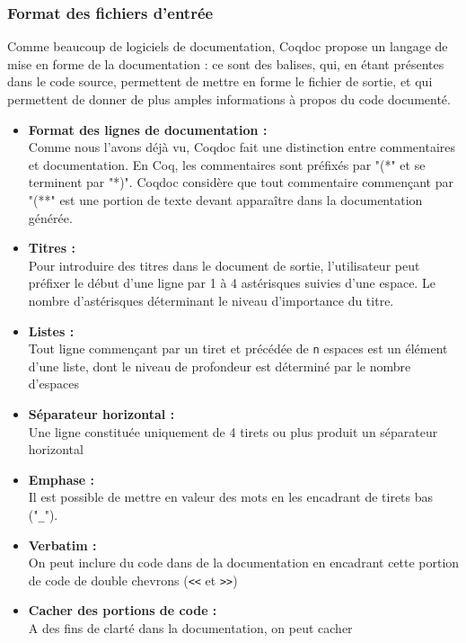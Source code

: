 \documentclass[a4paper, 11pt]{report}
\begin{document}
    \subsubsection{Format des fichiers d'entrée}
    Comme beaucoup de logiciels de documentation, Coqdoc propose un langage de
    mise en forme de la documentation : ce sont des balises, qui, en étant
    présentes dans le code source, permettent de mettre en forme le fichier de sortie,
    et qui permettent de donner de plus amples informations à propos du code
    documenté.
    \begin{itemize}
      \item[] \textbf{Format des lignes de documentation :} \\
      Comme nous l'avons déjà vu, Coqdoc fait une distinction entre commentaires
      et documentation. En Coq, les commentaires sont préfixés par "(*" et se
      terminent par "*)". Coqdoc considère que tout commentaire commençant par
      "(**" est une portion de texte devant apparaître dans la documentation
      générée.
      \item[] \textbf{Titres :} \\
      Pour introduire des titres dans le document de sortie, l'utilisateur
      peut préfixer le début d'une ligne par 1 à 4 astérisques suivies d'une
      espace. Le nombre d'astérisques déterminant le niveau d'importance du
      titre.
      \item[] \textbf{Listes :} \\
        Tout ligne commençant par un tiret et précédée de \texttt{n} espaces
        est un élément d'une liste, dont le niveau de profondeur est déterminé
        par le nombre d'espaces
      \item[] \textbf{Séparateur horizontal :} \\
        Une ligne constituée uniquement de 4 tirets ou plus produit un
        séparateur horizontal
      \item[] \textbf{Emphase :} \\
        Il est possible de mettre en valeur des mots en les encadrant
        de tirets bas ("\texttt{\_}").
      \item[] \textbf{Verbatim :} \\
        On peut inclure du code dans de la documentation en encadrant cette
        portion de code de double chevrons (\texttt{<<} et \texttt{>>})
      \item[] \textbf{Cacher des portions de code :} \\
        A des fins de clarté dans la documentation, on peut cacher

\end{itemize}
\end{document}

